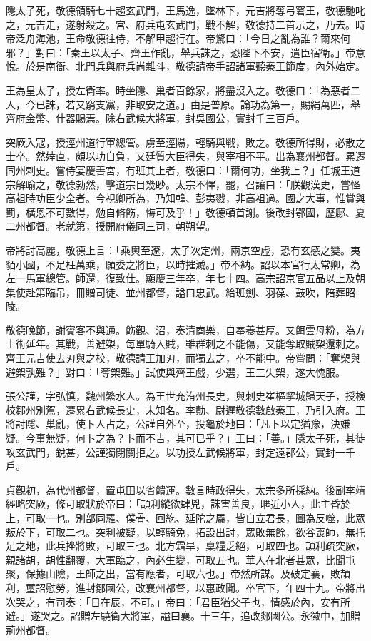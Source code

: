 \begin{pinyinscope}
 隱太子死，敬德領騎七十趨玄武門，王馬逸，墜林下，元吉將奪弓窘王，敬德馳叱之，元吉走，遂射殺之。宮、府兵屯玄武門，戰不解，敬德持二首示之，乃去。時帝泛舟海池，王命敬德往侍，不解甲趨行在。帝驚曰：「今日之亂為誰？爾來何邪？」對曰：「秦王以太子、齊王作亂，舉兵誅之，恐陛下不安，遣臣宿衛。」帝意悅。於是南衙、北門兵與府兵尚雜斗，敬德請帝手詔諸軍聽秦王節度，內外始定。



 王為皇太子，授左衛率。時坐隱、巢者百餘家，將盡沒入之。敬德曰：「為惡者二人，今已誅，若又窮支黨，非取安之道。」由是普原。論功為第一，賜絹萬匹，舉齊府金幣、什器賜焉。除右武候大將軍，封吳國公，實封千三百戶。



 突厥入寇，授涇州道行軍總管。虜至涇陽，輕騎與戰，敗之。敬德所得財，必散之士卒。然婞直，頗以功自負，又廷質大臣得失，與宰相不平。出為襄州都督。累遷同州刺史。嘗侍宴慶善宮，有班其上者，敬德曰：「爾何功，坐我上？」任城王道宗解喻之，敬德勃然，擊道宗目幾眇。太宗不懌，罷，召讓曰：「朕觀漢史，嘗怪高祖時功臣少全者。今視卿所為，乃知韓、彭夷戮，非高祖過。國之大事，惟賞與罰，橫恩不可數得，勉自脩飭，悔可及乎！」敬德頓首謝。後改封鄂國，歷鄜、夏二州都督。老就第，授開府儀同三司，朝朔望。



 帝將討高麗，敬德上言：「乘輿至遼，太子次定州，兩京空虛，恐有玄感之變。夷貊小國，不足枉萬乘，願委之將臣，以時摧滅。」帝不納。詔以本官行太常卿，為左一馬軍總管。師還，復致仕。顯慶三年卒，年七十四。高宗詔京官五品以上及朝集使赴第臨吊，冊贈司徒、並州都督，謚曰忠武。給班劍、羽葆、鼓吹，陪葬昭陵。



 敬德晚節，謝賓客不與通。飭觀、沼，奏清商樂，自奉養甚厚。又餌雲母粉，為方士術延年。其戰，善避槊，每單騎入賊，雖群刺之不能傷，又能奪取賊槊還刺之。齊王元吉使去刃與之校，敬德請王加刃，而獨去之，卒不能中。帝嘗問：「奪槊與避槊孰難？」對曰：「奪槊難。」試使與齊王戲，少選，王三失槊，遂大愧服。



 張公謹，字弘慎，魏州繁水人。為王世充洧州長史，與刺史崔樞挈城歸天子，授檢校鄒州別駕，遷累右武候長史，未知名。李勣、尉遲敬德數啟秦王，乃引入府。王將討隱、巢亂，使卜人占之，公謹自外至，投龜於地曰：「凡卜以定猶豫，決嫌疑。今事無疑，何卜之為？卜而不吉，其可已乎？」王曰：「善。」隱太子死，其徒攻玄武門，銳甚，公謹獨閉關拒之。以功授左武候將軍，封定遠郡公，實封一千戶。



 貞觀初，為代州都督，置屯田以省饋運。數言時政得失，太宗多所採納。後副李靖經略突厥，條可取狀於帝曰：「頡利縱欲肆兇，誅害善良，暱近小人，此主昏於上，可取一也。別部同羅、僕骨、回紇、延陀之屬，皆自立君長，圖為反噬，此眾叛於下，可取二也。突利被疑，以輕騎免，拓設出討，眾敗無餘，欲谷喪師，無托足之地，此兵挫將敗，可取三也。北方霜旱，稟糧乏絕，可取四也。頡利疏突厥，親諸胡，胡性翻覆，大軍臨之，內必生變，可取五也。華人在北者甚眾，比聞屯聚，保據山險，王師之出，當有應者，可取六也。」帝然所謀。及破定襄，敗頡利，璽詔慰勞，進封鄒國公，改襄州都督，以惠政聞。卒官下，年四十九。帝將出次哭之，有司奏：「日在辰，不可。」帝曰：「君臣猶父子也，情感於內，安有所避。」遂哭之。詔贈左驍衛大將軍，謚曰襄。十三年，追改郯國公。永徽中，加贈荊州都督。




\end{pinyinscope}
